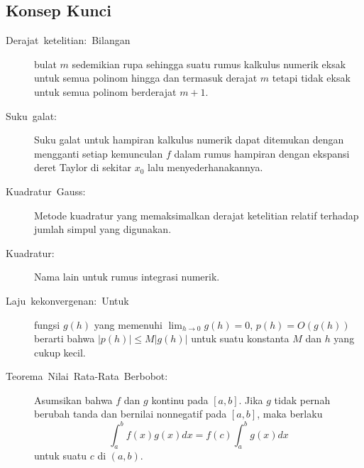 \subsection{Konsep Kunci}
\begin{description}
\item [{Derajat~ketelitian:~Bilangan}] bulat
$m$ sedemikian rupa sehingga suatu rumus kalkulus numerik eksak untuk
semua polinom hingga dan termasuk derajat $m$ tetapi tidak eksak
untuk semua polinom berderajat $m+1$.
\item [{Suku~galat:}] Suku galat untuk hampiran kalkulus numerik dapat
ditemukan dengan mengganti setiap kemunculan $f$ dalam rumus hampiran
dengan ekspansi deret Taylor di sekitar $x_{0}$ lalu menyederhanakannya.
\item [{Kuadratur~Gauss:}] Metode kuadratur yang
memaksimalkan derajat ketelitian relatif terhadap jumlah simpul yang
digunakan.
\item [{Kuadratur:}] Nama
lain untuk rumus integrasi numerik.
\item [{Laju~kekonvergenan:~Untuk}] fungsi
$g(h)$ yang memenuhi ${\displaystyle \lim_{h\to0}g(h)=0}$, $p(h)=O(g(h))$
berarti bahwa $|p(h)|\leq M|g(h)|$ untuk suatu konstanta $M$ dan
$h$ yang cukup kecil.
\item [{Teorema~Nilai~Rata-Rata~Berbobot:}] Asumsikan
bahwa $f$ dan $g$ kontinu pada $[a,b]$. Jika $g$ tidak pernah
berubah tanda dan bernilai nonnegatif pada $[a,b]$, maka berlaku
\[
\int_{a}^{b}f(x)g(x)dx=f(c)\int_{a}^{b}g(x)dx
\]
untuk suatu $c$ di $(a,b)$. 
\end{description}
